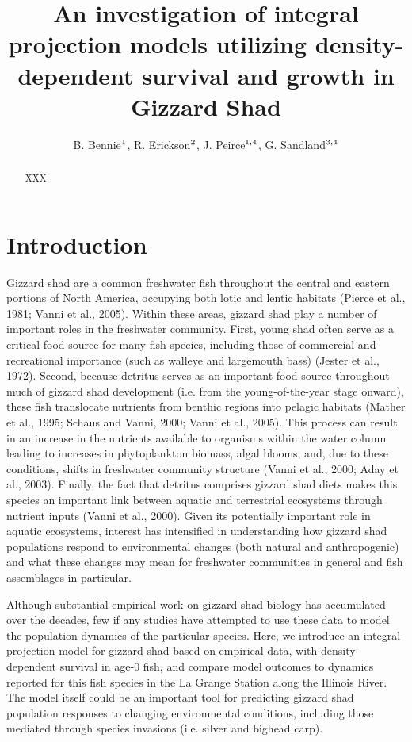 \documentclass[11pt,oneside]{amsart}
\title[Gizzard Shad Model]{An investigation of integral projection models utilizing density-dependent survival and growth in Gizzard Shad}
\author{B. Bennie$^{\rm 1}$, R. Erickson$^{\rm 2}$, J. Peirce$^{\rm 1,4}$,  G.  Sandland$^{\rm 3,4}$}
\theoremstyle{definition}
\begin{document}
\maketitle

\begin{abstract}
XXX
\end{abstract}

\section{Introduction}
Gizzard shad are a common freshwater fish throughout the central and eastern portions of North America, occupying both lotic and lentic habitats (Pierce et al., 1981; Vanni et al., 2005). Within these areas, gizzard shad play a number of important roles in the freshwater community. First, young shad often serve as a critical food source for many fish species, including those of commercial and recreational importance (such as walleye and largemouth bass) (Jester et al., 1972). Second, because detritus serves as an important food source throughout much of gizzard shad development (i.e. from the young-of-the-year stage onward), these fish translocate nutrients from benthic regions into pelagic habitats (Mather et al., 1995; Schaus and Vanni, 2000; Vanni et al., 2005). This process can result in an increase in the nutrients available to organisms within the water column leading to increases in phytoplankton biomass, algal blooms, and, due to these conditions, shifts in freshwater community structure (Vanni et al., 2000; Aday et al., 2003). Finally, the fact that detritus comprises gizzard shad diets makes this species an important link between aquatic and terrestrial ecosystems through nutrient inputs (Vanni et al., 2000). Given its potentially important role in aquatic ecosystems, interest has intensified in understanding how gizzard shad populations respond to environmental changes (both natural and anthropogenic) and what these changes may mean for freshwater communities in general and fish assemblages in particular.

Although substantial empirical work on gizzard shad biology has accumulated over the decades, few if any studies have attempted to use these data to model the population dynamics of the particular species. Here, we introduce an integral projection model for gizzard shad based on empirical data, with density-dependent survival in age-0 fish, and compare model outcomes to dynamics reported for this fish species in the La Grange Station along the Illinois River. The model itself could be an important tool for predicting gizzard shad population responses to changing environmental conditions, including those mediated through species invasions (i.e. silver and bighead carp).
\end{document}
